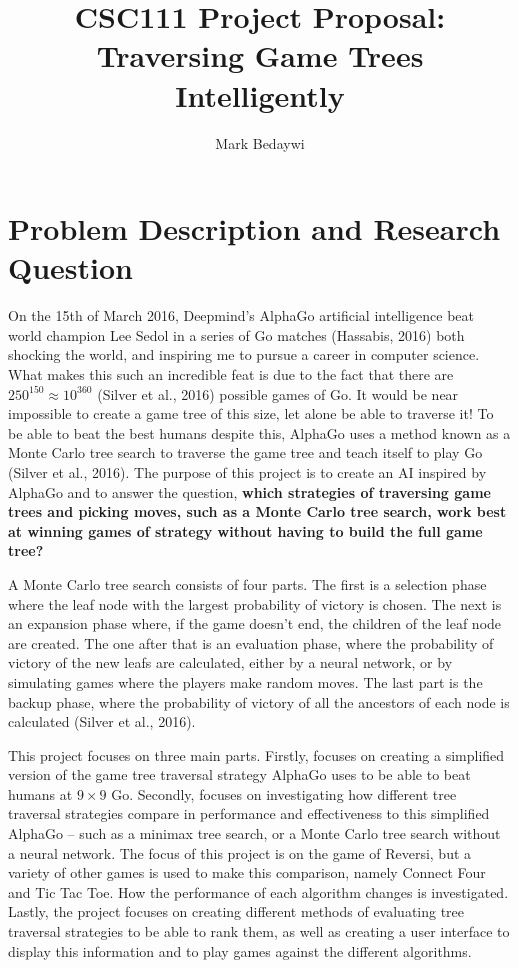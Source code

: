 \documentclass[fontsize=11pt]{article}
\title{CSC111 Project Proposal: Traversing Game Trees Intelligently}
\author{Mark Bedaywi}
\begin{document}
\maketitle

\section*{Problem Description and Research Question}
On the 15th of March 2016, Deepmind's AlphaGo artificial intelligence beat world champion Lee Sedol 
in a series of Go matches (Hassabis, 2016) both shocking the world, and inspiring me to pursue a career in computer science.
What makes this such an incredible feat is due to the fact that there are $250^{150} \approx 10^{360}$ (Silver et al., 2016) possible games of Go.
It would be near impossible to create a game tree of this size, let alone be able to traverse it! To be able to beat the best humans despite this, 
AlphaGo uses a method known as a Monte Carlo tree search to traverse the game tree and teach itself to play Go (Silver et al., 2016). The purpose of this project is to 
create an AI inspired by AlphaGo and to answer the question, \textbf{which strategies of traversing game trees and picking moves, such as a Monte Carlo tree search, 
work best at winning games of strategy without having to build the full game tree?} 

A Monte Carlo tree search consists of four parts. The first is a selection phase where the leaf node with the largest probability of victory is chosen. The next is 
an expansion phase where, if the game doesn't end, the children of the leaf node are created. The one after that is an evaluation phase, where the probability 
of victory of the new leafs are calculated, either by a neural network, or by simulating games where the players make random moves. The last part is the backup 
phase, where the probability of victory of all the ancestors of each node is calculated (Silver et al., 2016).

This project focuses on three main parts. Firstly, focuses on creating a simplified version of the game tree traversal strategy 
AlphaGo uses to be able to beat humans at $9 \times 9$ Go. Secondly, focuses on investigating how different tree traversal strategies compare 
in performance and effectiveness to this simplified AlphaGo -- such as a minimax tree search, or a Monte Carlo tree search without a neural network. 
The focus of this project is on the game of Reversi, but a variety of other games 
is used to make this comparison, namely Connect Four and Tic Tac Toe. How the performance of each algorithm changes is investigated. 
Lastly, the project focuses on creating different methods of evaluating tree traversal strategies to be able to rank them, 
as well as creating a user interface to display this information and to play games against the different algorithms. 
\end{document}
